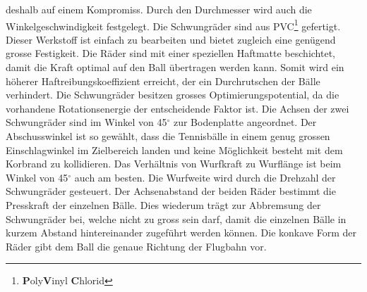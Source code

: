 deshalb auf einem Kompromiss. Durch den Durchmesser wird auch die Winkelgeschwindigkeit
festgelegt. Die Schwungräder sind aus PVC\footnote{\textbf{P}oly\textbf{V}inyl \textbf{C}hlorid}
gefertigt. Dieser Werkstoff ist einfach zu bearbeiten und bietet zugleich eine genügend grosse
Festigkeit. Die Räder sind mit einer speziellen Haftmatte beschichtet, damit die Kraft optimal auf
den Ball übertragen werden kann. Somit wird ein höherer Haftreibungskoeffizient erreicht, der ein
Durchrutschen der Bälle verhindert. Die Schwungräder besitzen grosses Optimierungspotential,
da die vorhandene Rotationsenergie der entscheidende Faktor ist. Die Achsen der zwei Schwungräder
sind im Winkel von 45$^\circ$ zur Bodenplatte angeordnet. Der Abschusswinkel ist so gewählt, dass die
Tennisbälle in einem genug grossen Einschlagwinkel im Zielbereich landen und keine Möglichkeit
besteht mit dem Korbrand zu kollidieren. Das Verhältnis von Wurfkraft zu Wurflänge ist beim Winkel
von 45$^\circ$ auch am besten. Die Wurfweite wird durch die Drehzahl der Schwungräder gesteuert. Der
Achsenabstand der beiden Räder bestimmt die Presskraft der einzelnen Bälle. Dies wiederum trägt zur
Abbremsung der Schwungräder bei, welche nicht zu gross sein darf, damit die einzelnen Bälle in
kurzem Abstand hintereinander zugeführt werden können. Die konkave Form der Räder gibt dem Ball die
genaue Richtung der Flugbahn vor.
	
	
	